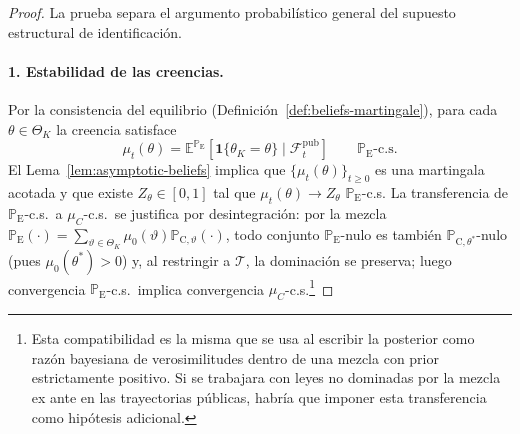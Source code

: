 \documentclass[12pt]{article}
\theoremstyle{definition}
\theoremstyle{remark}
\newcommand{\E}{\mathbb{E}}
\newcommand{\ProbE}{\mathbb{P}_{\mathrm{E}}}
\newcommand{\ProbC}[1]{\mathbb{P}_{\mathrm{C},#1}}
\newcommand{\1}{\mathbf{1}}
\begin{document}
\begin{proof}
La prueba separa el argumento probabilístico general del supuesto estructural de identificación.

\paragraph{1. Estabilidad de las creencias.}
Por la consistencia del equilibrio \textup{(}Definición~\ref{def:beliefs-martingale}\textup{)}, para cada $\theta\in\Theta_K$ la creencia satisface
\[
\mu_t(\theta)=\E^{\ProbE}\!\left[\mathbf{1}\{\theta_K=\theta\}\mid\mathcal{F}_t^{\mathrm{pub}}\right]
\qquad \ProbE\text{-c.s.}
\]
El Lema~\ref{lem:asymptotic-beliefs} implica que $\{\mu_t(\theta)\}_{t\ge0}$ es una martingala acotada y que existe $Z_\theta\in[0,1]$ tal que $\mu_t(\theta)\to Z_\theta$ $\ProbE$-c.s. La transferencia de $\ProbE$-c.s.\ a $\mu_C$-c.s.\ se justifica por desintegración: por la mezcla $\ProbE(\cdot)=\sum_{\vartheta\in\Theta_K}\mu_0(\vartheta)\ProbC{\vartheta}(\cdot)$, todo conjunto $\ProbE$-nulo es también $\ProbC{\theta^\ast}$-nulo \textup{(}pues $\mu_0(\theta^\ast)>0$\textup{)} y, al restringir a $\mathcal{T}$, la dominación se preserva; luego convergencia $\ProbE$-c.s.\ implica convergencia $\mu_C$-c.s.\footnote{Esta compatibilidad es la misma que se usa al escribir la posterior como razón bayesiana de verosimilitudes dentro de una mezcla con prior estrictamente positivo. Si se trabajara con leyes no dominadas por la mezcla ex ante en las trayectorias públicas, habría que imponer esta transferencia como hipótesis adicional.}


\end{proof}
\end{document}
